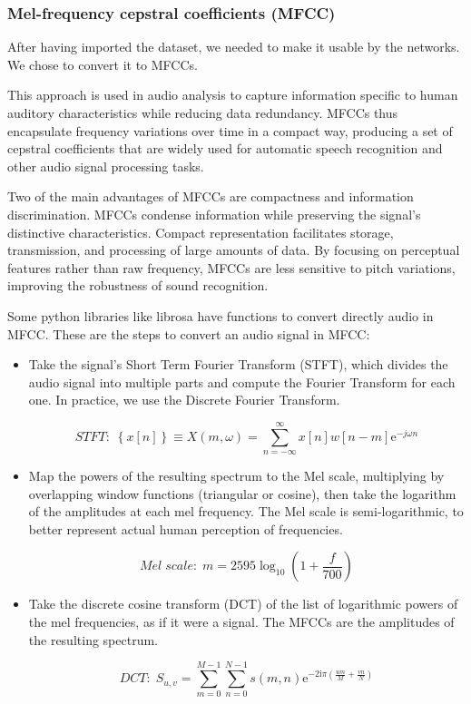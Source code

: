 \documentclass[11pt]{article}
\begin{document}
\subsubsection{Mel-frequency cepstral coefficients (MFCC)}

After having imported the dataset, we needed to make it usable by the networks. We chose to convert it to MFCCs.

This approach is used in audio analysis to capture information specific to human auditory characteristics while reducing data redundancy. MFCCs thus encapsulate frequency variations over time in a compact way, producing a set of cepstral coefficients that are widely used for automatic speech recognition and other audio signal processing tasks.

Two of the main advantages of MFCCs are compactness and information discrimination. MFCCs condense information while preserving the signal's distinctive characteristics. Compact representation facilitates storage, transmission, and processing of large amounts of data.
By focusing on perceptual features rather than raw frequency, MFCCs are less sensitive to pitch variations, improving the robustness of sound recognition.

Some python libraries like librosa have functions to convert directly audio in MFCC. These are the steps to convert an audio signal in MFCC:

\begin{itemize}
  \item Take the signal's Short Term Fourier Transform (STFT), which divides the audio signal into multiple parts and compute the Fourier Transform for each one. In practice, we use the Discrete Fourier Transform.

  \begin{equation}
  STFT: \;\left\{ x[ n ] \right\} \equiv X(m,\omega) = \sum_{n=-\infty}^{\infty} x[n]w[n-m]\mathrm{e}^{-j \omega n}
\end{equation}

  \item Map the powers of the resulting spectrum to the Mel scale, multiplying by overlapping window functions (triangular or cosine), then take the logarithm of the amplitudes at each mel frequency. The Mel scale is semi-logarithmic, to better represent actual human perception of frequencies.
  
  \begin{equation}
     Mel \; scale: \; m = 2595 \log_{10}\left(1 + \frac{f}{700}\right)
\end{equation}
  
  \item Take the discrete cosine transform (DCT) of the list of logarithmic powers of the mel frequencies, as if it were a signal. The MFCCs are the amplitudes of the resulting spectrum.
  
  \begin{equation}
     DCT: \; S_{u,v} = \sum_{m = 0}^{M- 1} \sum_{n = 0}^{N- 1} s(m, n)\mathrm e^{-2\mathrm i\pi \left ( \frac{um}M+ \frac{vn}N\right )}
\end{equation}
  
\end{itemize}
\end{document}
